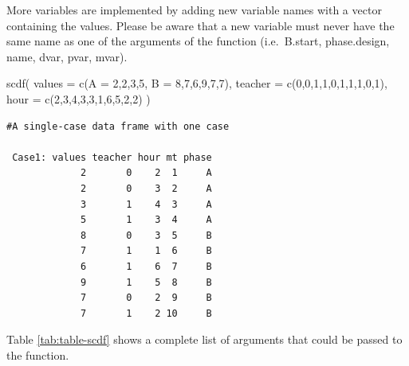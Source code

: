 \documentclass[
]{book}
\newenvironment{Shaded}{\begin{snugshade}}{\end{snugshade}}
\newcommand{\AttributeTok}[1]{\textcolor[rgb]{0.77,0.63,0.00}{#1}}
\newcommand{\DecValTok}[1]{\textcolor[rgb]{0.00,0.00,0.81}{#1}}
\newcommand{\FunctionTok}[1]{\textcolor[rgb]{0.00,0.00,0.00}{#1}}
\newcommand{\NormalTok}[1]{#1}
\begin{document}
More variables are implemented by adding new variable names with a vector containing the values. Please be aware that a new variable must never have the same name as one of the arguments of the function (i.e.~B.start, phase.design, name, dvar, pvar, mvar).

\begin{Shaded}
\begin{Highlighting}[]
\FunctionTok{scdf}\NormalTok{(}
  \AttributeTok{values =} \FunctionTok{c}\NormalTok{(}\AttributeTok{A =} \DecValTok{2}\NormalTok{,}\DecValTok{2}\NormalTok{,}\DecValTok{3}\NormalTok{,}\DecValTok{5}\NormalTok{, }\AttributeTok{B =} \DecValTok{8}\NormalTok{,}\DecValTok{7}\NormalTok{,}\DecValTok{6}\NormalTok{,}\DecValTok{9}\NormalTok{,}\DecValTok{7}\NormalTok{,}\DecValTok{7}\NormalTok{), }
  \AttributeTok{teacher =} \FunctionTok{c}\NormalTok{(}\DecValTok{0}\NormalTok{,}\DecValTok{0}\NormalTok{,}\DecValTok{1}\NormalTok{,}\DecValTok{1}\NormalTok{,}\DecValTok{0}\NormalTok{,}\DecValTok{1}\NormalTok{,}\DecValTok{1}\NormalTok{,}\DecValTok{1}\NormalTok{,}\DecValTok{0}\NormalTok{,}\DecValTok{1}\NormalTok{), }
  \AttributeTok{hour =} \FunctionTok{c}\NormalTok{(}\DecValTok{2}\NormalTok{,}\DecValTok{3}\NormalTok{,}\DecValTok{4}\NormalTok{,}\DecValTok{3}\NormalTok{,}\DecValTok{3}\NormalTok{,}\DecValTok{1}\NormalTok{,}\DecValTok{6}\NormalTok{,}\DecValTok{5}\NormalTok{,}\DecValTok{2}\NormalTok{,}\DecValTok{2}\NormalTok{)}
\NormalTok{)}
\end{Highlighting}
\end{Shaded}

\begin{verbatim}
#A single-case data frame with one case

 Case1: values teacher hour mt phase
             2       0    2  1     A
             2       0    3  2     A
             3       1    4  3     A
             5       1    3  4     A
             8       0    3  5     B
             7       1    1  6     B
             6       1    6  7     B
             9       1    5  8     B
             7       0    2  9     B
             7       1    2 10     B
\end{verbatim}

Table \ref{tab:table-scdf} shows a complete list of arguments that could be passed to the function.
\end{document}
